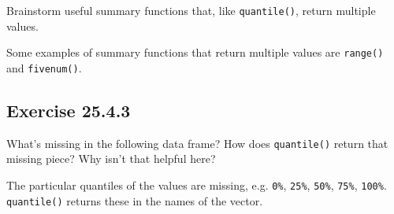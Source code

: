 \documentclass[]{book}
\newenvironment{Shaded}{\begin{snugshade}}{\end{snugshade}}
\newcommand{\CommentTok}[1]{\textcolor[rgb]{0.56,0.35,0.01}{\textit{#1}}}
\newcommand{\DataTypeTok}[1]{\textcolor[rgb]{0.13,0.29,0.53}{#1}}
\newcommand{\KeywordTok}[1]{\textcolor[rgb]{0.13,0.29,0.53}{\textbf{#1}}}
\newcommand{\NormalTok}[1]{#1}
\newcommand{\OperatorTok}[1]{\textcolor[rgb]{0.81,0.36,0.00}{\textbf{#1}}}
\newcommand{\StringTok}[1]{\textcolor[rgb]{0.31,0.60,0.02}{#1}}
\theoremstyle{plain}
\theoremstyle{remark}
\begin{document}
Brainstorm useful summary functions that, like \texttt{quantile()},
return multiple values.

Some examples of summary functions that return multiple values are
\texttt{range()} and \texttt{fivenum()}.

\begin{Shaded}
\end{Shaded}

\hypertarget{exercise-25.4.3}{%
\subsection*{\texorpdfstring{Exercise
{25.4.3}}{Exercise 25.4.3}}\label{exercise-25.4.3}}

What's missing in the following data frame? How does \texttt{quantile()}
return that missing piece? Why isn't that helpful here?

\begin{Shaded}
\end{Shaded}

The particular quantiles of the values are missing, e.g. \texttt{0\%},
\texttt{25\%}, \texttt{50\%}, \texttt{75\%}, \texttt{100\%}.
\texttt{quantile()} returns these in the names of the vector.

\begin{Shaded}
\end{Shaded}
\end{document}
